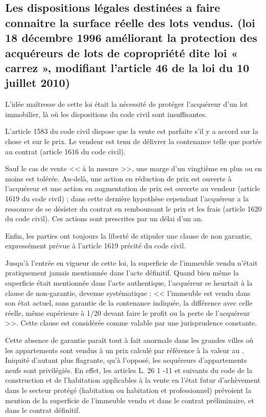 	\subsection[Loi << \nom{Carrez} >>]{Les dispositions légales destinées a faire connaitre la surface réelle des lots vendus. (loi 18 décembre 1996 améliorant la protection des acquéreurs de lots de copropriété dite loi « carrez », modifiant l’article 46 de la loi du 10 juillet 2010)}
		
		L’idée maîtresse de cette loi était la nécessité de protéger l’acquéreur d’un lot immobilier, là où les
		dispositions du code civil sont insuffisantes.
		
		L'article 1583 du code civil dispose que la vente est parfaite s'il y a accord sur la chose et sur le prix. Le
		vendeur est tenu de délivrer la contenance telle que portée au contrat (article 1616 du code civil).
		
		Sauf le cas de vente << à la mesure >>, une marge d'un vingtième en plus ou en moins est tolérée. Au-delà,
		une action en réduction de prix est ouverte à l'acquéreur et une action en augmentation de prix est
		ouverte au vendeur (article 1619 du code civil) ; dans cette dernière hypothèse cependant l'acquéreur a
		la ressource de se désister du contrat en remboursant le prix et les frais (article 1620 du code civil). Ces
		actions sont prescrites par un délai d'un an.
		
		Enfin, les parties ont toujours la liberté de stipuler une clause de non garantie, expressément prévue à
		l'article 1619 précité du code civil.
		
		Jusqu’à l’entrée en vigueur de cette loi, la superficie de l'immeuble vendu n'était pratiquement jamais
		mentionnée dans l'acte définitif. Quand bien même la superficie était mentionnée dans l'acte authentique,
		l'acquéreur se heurtait à la clause de non-garantie, devenue systématique : << l'immeuble est vendu dans
		son état actuel, sans garantie de la contenance indiquée, la différence avec celle réelle, même supérieure
		à 1/20\ieme{} devant faire le profit ou la perte de l'acquéreur >>. Cette clause est considérée comme valable par
		une jurisprudence constante.
		
		Cette absence de garantie paraît tout à fait anormale dans les grandes villes où les appartements sont
		vendus à un prix calculé par référence à la valeur au \metreCarre. Iniquité d'autant plus flagrante, qu'à l'opposé, les
		acquéreurs d'appartements neufs sont privilégiés. En effet, les articles L. 26 1 -11 et suivants du code de
		la construction et de l'habitation applicables à la vente en l'état futur d'achèvement dans le secteur
		protégé (habitation ou habitation et professionnel) prévoient la mention de la superficie de l'immeuble
		vendu et dans le contrat préliminaire, et dans le contrat définitif.
		
